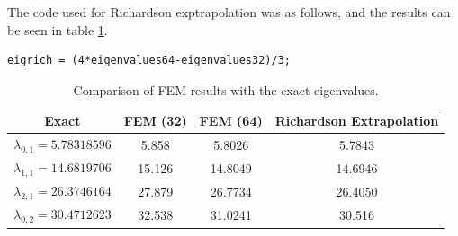 \documentclass[letterpaper, reqno,11pt]{article}
\begin{document}
The code used for Richardson exptrapolation was as follows, and the results can be seen in table \ref{tab:q1}.
\begin{lstlisting}
eigrich = (4*eigenvalues64-eigenvalues32)/3;
\end{lstlisting}

\begin{table}[H]
\centering
\begin{tabular}{|c|c|c|c|}
\hline
Exact & FEM (32) & FEM (64) & Richardson Extrapolation \\ \hline
\(\lambda_{0,1} = 5.78318596\) & 5.858 & 5.8026 & 5.7843 \\ \hline
\(\lambda_{1,1} = 14.6819706\) & 15.126 & 14.8049 & 14.6946 \\ \hline
\(\lambda_{2,1} = 26.3746164\) & 27.879 & 26.7734 & 26.4050 \\ \hline
\(\lambda_{0,2} = 30.4712623\) & 32.538 & 31.0241 & 30.516 \\ \hline
\end{tabular}
\caption{Comparison of FEM results with the exact eigenvalues.}
\label{tab:q1}
\end{table}
\end{document}

